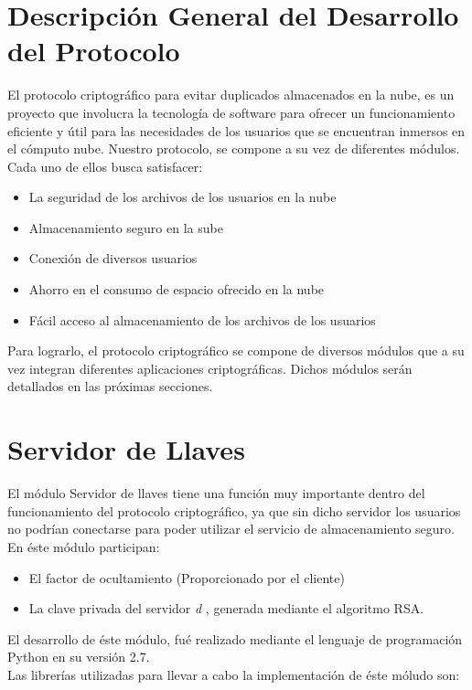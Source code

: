 


\section{Descripción General del Desarrollo del Protocolo}
El protocolo criptográfico para evitar duplicados almacenados en la nube, es un proyecto que involucra la tecnología de software para ofrecer un funcionamiento eficiente y útil para las necesidades de los usuarios que se encuentran inmersos en el cómputo nube. 
Nuestro protocolo, se compone a su vez de diferentes módulos. Cada uno de ellos busca satisfacer: \\ 

\begin{itemize}

\item La seguridad de los archivos de los usuarios en la nube
\item Almacenamiento seguro en la sube
\item Conexión de diversos usuarios 
\item Ahorro en el consumo de espacio ofrecido en la nube 
\item Fácil acceso al almacenamiento de los archivos de los usuarios 

\end{itemize} 

Para lograrlo, el protocolo criptográfico se compone de diversos módulos que a su vez integran diferentes aplicaciones criptográficas. Dichos módulos serán detallados en las próximas secciones. 

\section{Servidor de Llaves}
El módulo Servidor de llaves tiene una función muy importante dentro del funcionamiento del protocolo criptográfico, ya que sin dicho servidor los usuarios no podrían conectarse para poder utilizar el servicio de almacenamiento seguro. 
En éste módulo participan: 
\begin{itemize}
	\item El factor de ocultamiento (Proporcionado por el cliente)
	\item La clave privada del servidor \textit{d} , generada mediante el algoritmo RSA. 
	\end{itemize}

El desarrollo de éste módulo, fué realizado mediante el lenguaje de programación Python en su versión 2.7. \\
Las librerías utilizadas para llevar a cabo la implementación de éste móludo son: 

